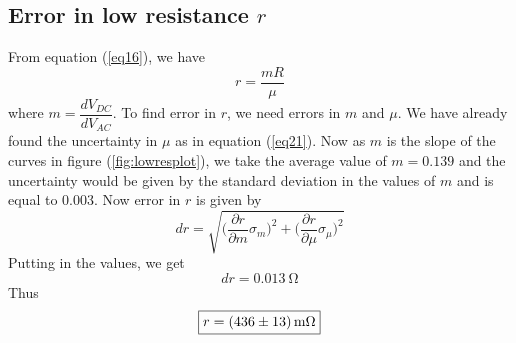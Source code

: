 \documentclass[%
 reprint,
nofootinbib,
 amsmath,amssymb,
 aps,
]{revtex4-2}
\begin{document}
    \subsection{Error in low resistance $r$}
        From equation (\ref{eq16}), we have
        \begin{equation}
            r = \dfrac{m R}{\mu}
        \end{equation}
        where $m = \dfrac{d V_{DC}}{d V_{AC}}$. To find error in $r$, we need errors in $m$ and $\mu$. We have already found the uncertainty in $\mu$ as in equation (\ref{eq21}). Now as $m$ is the slope of the curves in figure (\ref{fig:lowresplot}), we take the average value of $m = 0.139$ and the uncertainty would be given by the standard deviation in the values of $m$ and is equal to 0.003. Now error in $r$ is given by
        \begin{equation}
            dr = \sqrt{\Big(\dfrac{\partial r}{\partial m} \sigma_{m}\Big)^2 + \Big(\dfrac{\partial r}{\partial \mu} \sigma_{\mu}\Big)^2}
        \end{equation}
        Putting in the values, we get
        \begin{equation}
            dr = \SI{0.013}{\ohm}
        \end{equation}
        Thus
        \begin{equation}
            \boxed{r = \SI[separate-uncertainty=true]{436 \pm 13}{\milli \ohm}}
        \end{equation}
\end{document}
